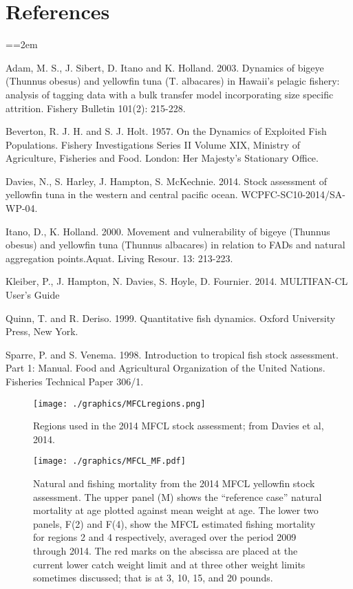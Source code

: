 \documentclass[12pt,letterpaper]{article}
\newcommand\doublespacing{\baselineskip=1.6\normalbaselineskip}
\begin{document}
\section*{References}
{\parindent=0cm \small
\everypar={\hangindent=2em }\par
\doublespacing
Adam, M. S., J. Sibert, D. Itano and K. Holland. 2003. Dynamics of
bigeye (Thunnus obesus) and yellowfin tuna (T. albacares) in Hawaii's
pelagic fishery: analysis of tagging data with a bulk transfer model
incorporating size specific attrition. Fishery Bulletin 101(2):
215-228.

Beverton, R. J. H. and S. J. Holt. 1957. On the Dynamics of Exploited
Fish Populations. Fishery Investigations Series II Volume XIX,
Ministry of Agriculture, Fisheries and Food. London: Her Majesty's
Stationary Office.

Davies, N., S. Harley, J. Hampton, S. McKechnie. 2014. Stock
assessment of yellowfin tuna in the western and central pacific ocean.
WCPFC-SC10-2014/SA-WP-04.

Itano, D., K. Holland. 2000.  Movement and vulnerability of bigeye
(Thunnus obesus) and yellowfin tuna (Thunnus albacares) in relation to
FADs and natural aggregation points.Aquat. Living Resour. 13: 213-223.

Kleiber, P., J. Hampton, N. Davies, S. Hoyle, D. Fournier. 2014.
MULTIFAN-CL User’s Guide

Quinn, T. and R. Deriso. 1999. Quantitative fish dynamics. Oxford
University Press, New York.

Sparre, P. and S. Venema. 1998. Introduction to tropical fish stock
assessment. Part 1: Manual. Food and Agricultural Organization of the
United Nations. Fisheries Technical Paper 306/1.
\par}

\begin{figure}
\begin{center}
\texttt{[image: ./graphics/MFCLregions.png]}
\caption{\label{fig:mfclreg}
Regions used in the 2014 MFCL stock assessment; from Davies et al,
2014.
}
\end{center}
\end{figure}

\begin{figure}
\begin{center}
\texttt{[image: ./graphics/MFCL\_MF.pdf]}
\caption{\label{fig:mfclmf}
Natural and fishing mortality from the 2014 MFCL yellowfin stock
assessment. The upper panel (M) shows the ``reference case'' natural
mortality at age plotted against mean weight at age.
The lower two panels, F(2) and F(4), show the MFCL estimated fishing
mortality for regions 2 and 4 respectively, averaged over the period
2009 through 2014.
The red marks on the abscissa are placed at
the current lower catch weight limit and at three other
weight limits sometimes discussed; 
that is at 3, 10, 15, and 20 pounds.
}
\end{center}
\end{figure}
\end{document}
